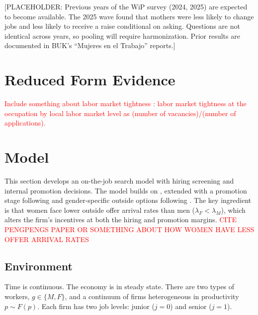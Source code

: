 \documentclass[11pt]{article}
\begin{document}
[PLACEHOLDER: Previous years of the WiP survey (2024, 2025) are expected to become available. The 2025 wave found that mothers were less likely to change jobs and less likely to receive a raise conditional on asking. Questions are not identical across years, so pooling will require harmonization. Prior results are documented in BUK's ``Mujeres en el Trabajo'' reports.]

\section{Reduced Form Evidence}
\textcolor{red}{Include something about labor market tightness :  labor market tightness at the occupation by local labor market level as (number of vacancies)/(number of applications).}

\section{Model}

This section develops an on-the-job search model with hiring screening and internal promotion decisions. The model builds on \citet{burdett_wage_1998}, extended with a promotion stage following \citet{gibbons_theory_1999} and gender-specific outside options following \citet{sharma_monopsony_2023}. The key ingredient is that women face lower outside offer arrival rates than men ($\lambda_F < \lambda_M$), which alters the firm's incentives at both the hiring and promotion margins. \textcolor{red}{CITE PENGPENGS PAPER OR SOMETHING ABOUT HOW WOMEN HAVE LESS OFFER ARRIVAL RATES}

\subsection{Environment}

Time is continuous. The economy is in steady state. There are two types of workers, $g \in \{M, F\}$, and a continuum of firms heterogeneous in productivity $p \sim F(p)$. Each firm has two job levels: junior ($j=0$) and senior ($j=1$).
\end{document}
